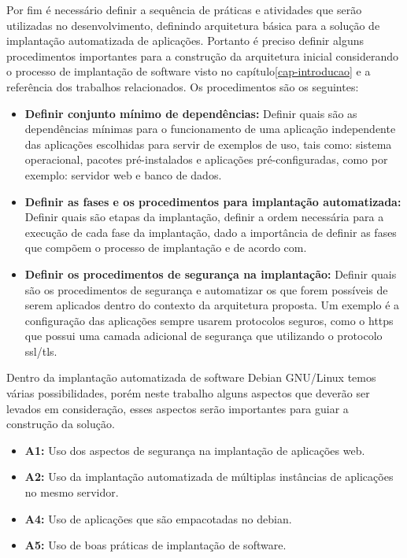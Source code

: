 Por fim é necessário definir a sequência de práticas e atividades que serão
utilizadas no desenvolvimento, definindo arquitetura básica para a solução de
implantação automatizada de aplicações. Portanto é preciso definir alguns
procedimentos importantes para a construção da arquitetura inicial considerando
o processo de implantação de software visto no capítulo\ref{cap-introducao}
e a referência dos trabalhos relacionados. Os procedimentos são os seguintes:

\begin{itemize}
  \item  \textbf{Definir conjunto mínimo de dependências:} Definir quais são as dependências
  mínimas para o funcionamento de uma aplicação independente das aplicações escolhidas para
  servir de exemplos de uso, tais como: sistema operacional, pacotes pré-instalados
  e aplicações pré-configuradas, como por exemplo: servidor web e banco de dados.
  \item  \textbf{Definir as fases e os procedimentos para implantação automatizada:}
   Definir quais são etapas da implantação, definir a ordem necessária para a execução de
  cada fase da implantação, dado a importância de definir as fases que compõem o processo de
  implantação e de acordo com\cite{omg2006}.
  \item  \textbf{Definir os procedimentos de segurança na implantação:} Definir
  quais são os procedimentos de segurança e automatizar os que forem possíveis
  de serem aplicados dentro do contexto da arquitetura proposta. Um exemplo
  é a configuração das aplicações sempre usarem protocolos seguros, como o https
  que possui uma camada adicional de segurança que utilizando o protocolo ssl/tls.
\end{itemize}

Dentro da implantação automatizada de software Debian GNU/Linux temos várias
possibilidades, porém neste trabalho alguns aspectos que deverão ser levados em
consideração, esses aspectos serão importantes para guiar a construção da solução.

\begin{itemize}
  \item  \textbf{A1:} Uso dos aspectos de segurança na implantação de aplicações web.
  \item  \textbf{A2:} Uso da implantação automatizada de múltiplas instâncias de
   aplicações no mesmo servidor.
  \item  \textbf{A4:} Uso de aplicações que são empacotadas no debian.
  \item  \textbf{A5:} Uso de boas práticas de implantação de software.
\end{itemize}

